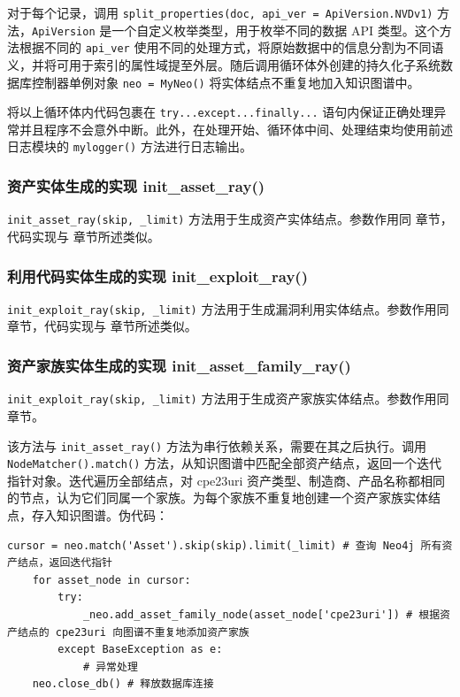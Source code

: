\documentclass[a4paper,AutoFakeBold,oneside,12pt]{book}
\begin{document}
对于每个记录，调用 \lstinline|split_properties(doc, api_ver = ApiVersion.NVDv1)| 方法，\lstinline|ApiVersion| 是一个自定义枚举类型，用于枚举不同的数据 API 类型。这个方法根据不同的 \lstinline|api_ver| 使用不同的处理方式，将原始数据中的信息分割为不同语义，并将可用于索引的属性域提至外层。随后调用循环体外创建的持久化子系统数据库控制器单例对象 \lstinline|neo = MyNeo()| 将实体结点不重复地加入知识图谱中。

将以上循环体内代码包裹在 \lstinline|try...except...finally...| 语句内保证正确处理异常并且程序不会意外中断。此外，在处理开始、循环体中间、处理结束均使用前述日志模块的 \lstinline|mylogger()| 方法进行日志输出。

\subsubsection{资产实体生成的实现 init{\_}asset{\_}ray()}

\lstinline|init_asset_ray(skip, _limit)| 方法用于生成资产实体结点。参数作用同  章节，代码实现与  章节所述类似。

\subsubsection{利用代码实体生成的实现 init{\_}exploit{\_}ray()}

\lstinline|init_exploit_ray(skip, _limit)| 方法用于生成漏洞利用实体结点。参数作用同  章节，代码实现与  章节所述类似。

\subsubsection{资产家族实体生成的实现 init{\_}asset{\_}family{\_}ray()}

\lstinline|init_exploit_ray(skip, _limit)| 方法用于生成资产家族实体结点。参数作用同  章节。

该方法与 \lstinline|init_asset_ray()| 方法为串行依赖关系，需要在其之后执行。调用 \lstinline|NodeMatcher().match()| 方法，从知识图谱中匹配全部资产结点，返回一个迭代指针对象。迭代遍历全部结点，对 cpe23uri 资产类型、制造商、产品名称都相同的节点，认为它们同属一个家族。为每个家族不重复地创建一个资产家族实体结点，存入知识图谱。伪代码：
\begin{lstlisting}[style=lgeneral]
	cursor = neo.match('Asset').skip(skip).limit(_limit) # 查询 Neo4j 所有资产结点，返回迭代指针
	for asset_node in cursor:
		try:
			_neo.add_asset_family_node(asset_node['cpe23uri']) # 根据资产结点的 cpe23uri 向图谱不重复地添加资产家族
		except BaseException as e:
			# 异常处理
	neo.close_db() # 释放数据库连接
\end{lstlisting}
\end{document}
